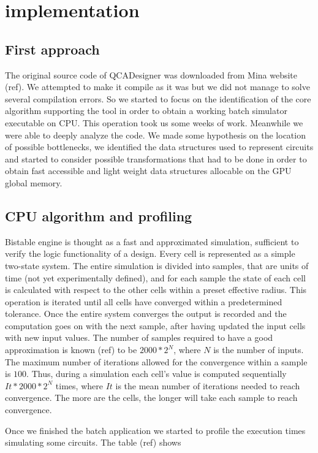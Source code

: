 \chapter{implementation}\label{sec:implementation}
\section{First approach}
The original source code of QCADesigner was downloaded from Mina website (ref). We attempted to make it compile as it was but we did not manage to solve several compilation errors. So we started to focus on the identification of the core algorithm supporting the tool in order to obtain a working batch simulator executable on CPU. This operation took us some weeks of work. Meanwhile we were able to deeply analyze the code. We made some hypothesis on the location of possible bottlenecks, we identified the data structures used to represent circuits and started to consider possible transformations that had to be done in order to obtain fast accessible and light weight data structures allocable on the GPU global memory.

\section{CPU algorithm and profiling}
Bistable engine is thought as a fast and approximated simulation, sufficient to verify the logic functionality of a design. Every cell is represented as a simple two-state system. The entire simulation is divided into samples, that are units of time (not yet experimentally defined), and for each sample the state of each cell is calculated with respect to the other cells within a preset effective radius. This operation is iterated until all cells have converged within a predetermined tolerance. Once the entire system converges the output is recorded and the computation goes on with the next sample, after having updated the input cells with new input values.
The number of samples required to have a good approximation is known (ref) to be $2000*2^N$, where $N$ is the number of inputs. The maximum number of iterations allowed for the convergence within a sample is $100$. Thus, during a simulation each cell's value is computed sequentially $It*2000*2^N$ times, where $It$ is the mean number of iterations needed to reach convergence. The more are the cells, the longer will take each sample to reach convergence.

Once we finished the batch application we started to profile the execution times simulating some circuits. The table (ref) shows 